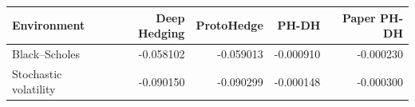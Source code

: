 \begin{tabular}{lrrrr}
\toprule
Environment & Deep Hedging & ProtoHedge & PH-DH & Paper PH-DH \\
\midrule
Black--Scholes & -0.058102 & -0.059013 & -0.000910 & -0.000230 \\
Stochastic volatility & -0.090150 & -0.090299 & -0.000148 & -0.000300 \\
\bottomrule
\end{tabular}
